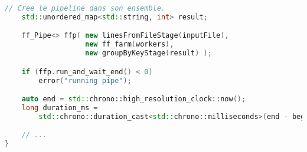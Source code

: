 \begin{lstlisting}[basicstyle=\ttfamily\footnotesize,language=c++]
    // Cree le pipeline dans son ensemble.
    std::unordered_map<std::string, int> result;

    ff_Pipe<> ffp( new linesFromFileStage(inputFile),
                   new ff_farm(workers),
                   new groupByKeyStage(result) );

    if (ffp.run_and_wait_end() < 0) 
        error("running pipe");

    auto end = std::chrono::high_resolution_clock::now();
    long duration_ms = 
        std::chrono::duration_cast<std::chrono::milliseconds>(end - begin).count();

    // ...
}
\end{lstlisting}
